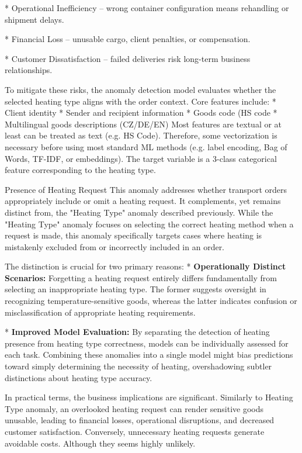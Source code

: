 * Operational Inefficiency – wrong container configuration means rehandling or shipment delays.

* Financial Loss – unusable cargo, client penalties, or compensation.

* Customer Dissatisfaction – failed deliveries risk long-term business relationships.
\enditems

To mitigate these risks, the anomaly detection model evaluates whether the selected heating type aligns with the order context. Core features include:
\begitems
* Client identity
* Sender and recipient information
* Goods code (HS code
* Multilingual goods descriptions (CZ/DE/EN)
\enditems
Most features are textual or at least can be treated as text (e.g. HS Code). Therefore, some vectorization is necessary before using most standard ML methods (e.g. label encoding, Bag of Words, TF-IDF, or embeddings). The target variable is a 3-class categorical feature corresponding to the heating type.

\secc Presence of Heating Request
This anomaly addresses whether transport orders appropriately include or omit a heating request. It complements, yet remains distinct from, the "Heating Type" anomaly described previously. While the "Heating Type" anomaly focuses on selecting the correct heating method when a request is made, this anomaly specifically targets cases where heating is mistakenly excluded from or incorrectly included in an order.

The distinction is crucial for two primary reasons:
\begitems
* {\bf Operationally Distinct Scenarios:}
Forgetting a heating request entirely differs fundamentally from selecting an inappropriate heating type. The former suggests oversight in recognizing temperature-sensitive goods, whereas the latter indicates confusion or misclassification of appropriate heating requirements.

* {\bf Improved Model Evaluation:}
By separating the detection of heating presence from heating type correctness, models can be individually assessed for each task. Combining these anomalies into a single model might bias predictions toward simply determining the necessity of heating, overshadowing subtler distinctions about heating type accuracy.
\enditems

In practical terms, the business implications are significant. Similarly to Heating Type anomaly, an overlooked heating request can render sensitive goods unusable, leading to financial losses, operational disruptions, and decreased customer satisfaction. Conversely, unnecessary heating requests generate avoidable costs. Although they seems highly unlikely.

